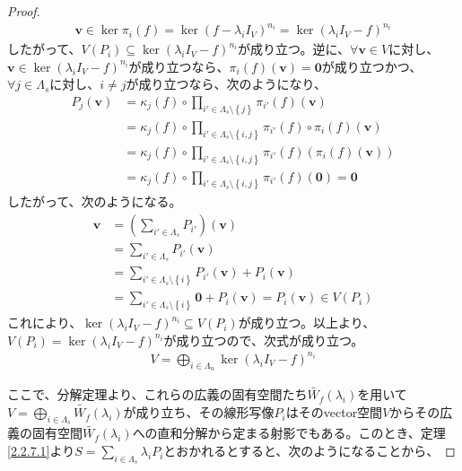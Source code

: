 \documentclass[dvipdfmx]{jsarticle}
\begin{document}
\begin{proof}
\begin{align*}
\mathbf{v} \in \ker{\pi_{i}(f)} = \ker\left( f - \lambda_{i}I_{V} \right)^{n_{i}} = \ker\left( \lambda_{i}I_{V} - f \right)^{n_{i}}
\end{align*}
したがって、$V\left( P_{i} \right) \subseteq \ker\left( \lambda_{i}I_{V} - f \right)^{n_{i}}$が成り立つ。逆に、$\forall\mathbf{v} \in V$に対し、$\mathbf{v} \in \ker\left( \lambda_{i}I_{V} - f \right)^{n_{i}}$が成り立つなら、$\pi_{i}(f)\left( \mathbf{v} \right) = \mathbf{0}$が成り立つかつ、$\forall j \in \varLambda_{s}$に対し、$i \neq j$が成り立つなら、次のようになり、
\begin{align*}
P_{j}\left( \mathbf{v} \right) &= \kappa_{j}(f) \circ \prod_{i' \in \varLambda_{s} \setminus \left\{ j \right\}} {\pi_{i'}(f)}\left( \mathbf{v} \right) \\
&= \kappa_{j}(f) \circ \prod_{i' \in \varLambda_{s} \setminus \left\{ i,j \right\}} {\pi_{i'}(f)} \circ \pi_{i}(f)\left( \mathbf{v} \right) \\
&= \kappa_{j}(f) \circ \prod_{i' \in \varLambda_{s} \setminus \left\{ i,j \right\}} {\pi_{i'}(f)}\left( \pi_{i}(f)\left( \mathbf{v} \right) \right) \\
&= \kappa_{j}(f) \circ \prod_{i' \in \varLambda_{s} \setminus \left\{ i,j \right\}} {\pi_{i'}(f)}\left( \mathbf{0} \right) = \mathbf{0}
\end{align*}
したがって、次のようになる。
\begin{align*}
\mathbf{v} &= \left( \sum_{i' \in \varLambda_{s}} P_{i'} \right)\left( \mathbf{v} \right) \\
&= \sum_{i' \in \varLambda_{s}} {P_{i'}\left( \mathbf{v} \right)} \\
&= \sum_{i' \in \varLambda_{s} \setminus \left\{ i \right\}} {P_{i'}\left( \mathbf{v} \right)} + P_{i}\left( \mathbf{v} \right) \\
&= \sum_{i' \in \varLambda_{s} \setminus \left\{ i \right\}} \mathbf{0} + P_{i}\left( \mathbf{v} \right) = P_{i}\left( \mathbf{v} \right) \in V\left( P_{i} \right)
\end{align*}
これにより、$\ker\left( \lambda_{i}I_{V} - f \right)^{n_{i}} \subseteq V\left( P_{i} \right)$が成り立つ。以上より、$V\left( P_{i} \right) = \ker\left( \lambda_{i}I_{V} - f \right)^{n_{i}}$が成り立つので、次式が成り立つ。
\begin{align*}
V = \bigoplus_{i \in \varLambda_{n}} {\ker\left( \lambda_{i}I_{V} - f \right)^{n_{i}}}
\end{align*}\par
ここで、分解定理より、これらの広義の固有空間たち$\widetilde{W_{f}}\left( \lambda_{i} \right)$を用いて$V = \bigoplus_{i \in \varLambda_{s}} {\widetilde{W_{f}}\left( \lambda_{i} \right)}$が成り立ち、その線形写像$P_{i}$はそのvector空間$V$からその広義の固有空間$\widetilde{W_{f}}\left( \lambda_{i} \right)$への直和分解から定まる射影でもある。このとき、定理\ref{2.2.7.1}より$S = \sum_{i \in \varLambda_{s}} {\lambda_{i}P_{i}}$とおかれるとすると、次のようになることから、

\end{proof}
\end{document}
